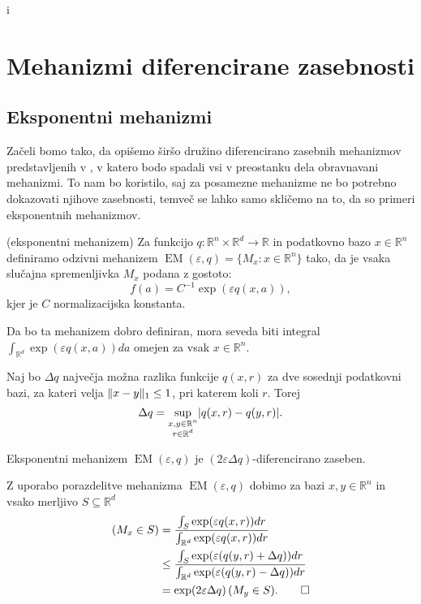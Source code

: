 i\documentclass[mat1]{fmfdelo}
\DeclarePairedDelimiter{\abs}{\lvert}{\rvert}
\DeclarePairedDelimiter{\norm}{\lVert}{\rVert}
\newcommand{\R}{\mathbb R}
\let\P\relax \DeclareMathOperator*{\P}{\mathbb P}
\begin{document}
\section{Mehanizmi diferencirane zasebnosti}

\subsection{Eksponentni mehanizmi}

Začeli bomo tako, da opišemo širšo družino diferencirano zasebnih mehanizmov predstavljenih v \cite{expmech}, v katero bodo spadali vsi v preostanku dela obravnavani mehanizmi. To nam bo koristilo, saj za posamezne mehanizme ne bo potrebno dokazovati njihove zasebnosti, temveč se lahko samo skličemo na to, da so primeri eksponentnih mehanizmov.

\begin{definicija}
    (eksponentni mehanizem) Za funkcijo $q: \R^n \times \R^d \to \R$ in podatkovno bazo $x \in \R^n$ definiramo odzivni mehanizem $\operatorname{EM}(\varepsilon, q) =\{M_x: x \in \R^n\}$ tako, da je vsaka slučajna spremenljivka $M_x$ podana z gostoto:
    \begin{equation*}
        f(a) = C^{-1} \exp(\varepsilon q(x, a)),
    \end{equation*}
    kjer je $C$ normalizacijska konstanta.
\end{definicija}

\begin{opomba}
    Da bo ta mehanizem dobro definiran, mora seveda biti integral $\int_{\R^d} \exp(\varepsilon q(x, a)) da$ omejen za vsak $x \in \R^n$.
\end{opomba}

Naj bo $\Delta q$ največja možna razlika funkcije $q(x, r)$ za dve sosednji podatkovni bazi, za kateri velja $\norm{x-y}_1 \leq 1$, pri katerem koli $r$. Torej
\begin{equation*}
    \Delta q = \sup_{\substack{x,y \in \R^n\\ r \in \R^d}} \abs{q(x,r)-q(y,r)}.
\end{equation*}

\begin{izrek} \label{expmech}
    Eksponentni mehanizem $\operatorname{EM}(\varepsilon, q)$ je $(2\varepsilon \Delta q)$-diferencirano zaseben.
\end{izrek}

\begin{dokaz}
    Z uporabo porazdelitve mehanizma $\operatorname{EM}(\varepsilon, q)$ dobimo za bazi $x,y \in \R^n$ in vsako merljivo $S \subseteq \R^d$
    \begin{align*}
        \P(M_x \in S) &= \frac{\int_S \exp(\varepsilon q(x, r))dr}{\int_{\R^d} \exp(\varepsilon q(x, r))dr}  \\
        &\leq \frac{\int_S \exp(\varepsilon (q(y, r)+\Delta q))dr}{\int_{\R^d} \exp(\varepsilon (q(y, r)-\Delta q))dr} \\
        &=  \exp(2\varepsilon \Delta q)\, \P(M_y \in S). \qedhere
    \end{align*}
\end{dokaz}
\end{document}
